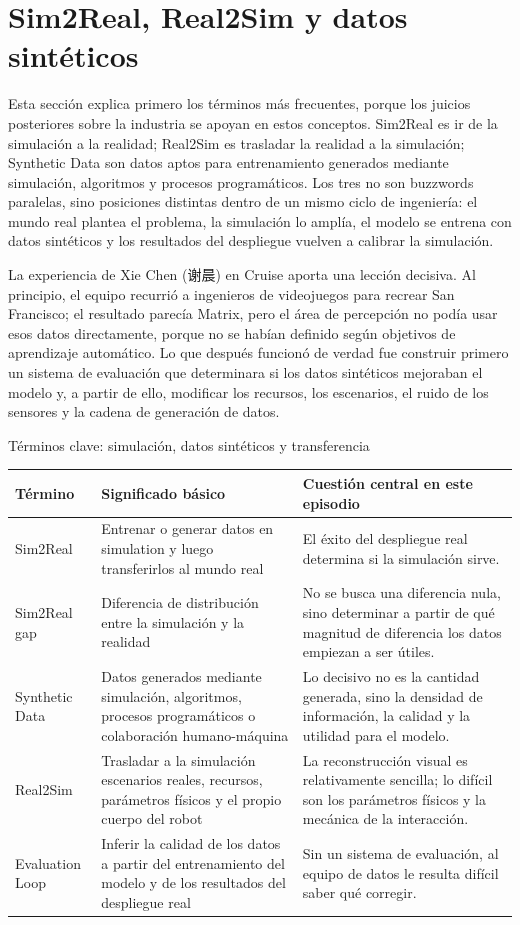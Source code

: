 \section{Sim2Real, Real2Sim y datos sintéticos}

Esta sección explica primero los términos más frecuentes, porque los juicios posteriores sobre la industria se apoyan en estos conceptos. Sim2Real es ir de la simulación a la realidad; Real2Sim es trasladar la realidad a la simulación; Synthetic Data son datos aptos para entrenamiento generados mediante simulación, algoritmos y procesos programáticos. Los tres no son buzzwords paralelas, sino posiciones distintas dentro de un mismo ciclo de ingeniería: el mundo real plantea el problema, la simulación lo amplía, el modelo se entrena con datos sintéticos y los resultados del despliegue vuelven a calibrar la simulación.

La experiencia de Xie Chen (谢晨) en Cruise aporta una lección decisiva. Al principio, el equipo recurrió a ingenieros de videojuegos para recrear San Francisco; el resultado parecía Matrix, pero el área de percepción no podía usar esos datos directamente, porque no se habían definido según objetivos de aprendizaje automático. Lo que después funcionó de verdad fue construir primero un sistema de evaluación que determinara si los datos sintéticos mejoraban el modelo y, a partir de ello, modificar los recursos, los escenarios, el ruido de los sensores y la cadena de generación de datos.

\begin{knowledgebox}{Términos clave: simulación, datos sintéticos y transferencia}
\begin{tabularx}{\textwidth}{p{}p{}X}
\toprule
Término & Significado básico & Cuestión central en este episodio \\
\midrule
Sim2Real & Entrenar o generar datos en simulation y luego transferirlos al mundo real & El éxito del despliegue real determina si la simulación sirve. \\
Sim2Real gap & Diferencia de distribución entre la simulación y la realidad & No se busca una diferencia nula, sino determinar a partir de qué magnitud de diferencia los datos empiezan a ser útiles. \\
Synthetic Data & Datos generados mediante simulación, algoritmos, procesos programáticos o colaboración humano-máquina & Lo decisivo no es la cantidad generada, sino la densidad de información, la calidad y la utilidad para el modelo. \\
Real2Sim & Trasladar a la simulación escenarios reales, recursos, parámetros físicos y el propio cuerpo del robot & La reconstrucción visual es relativamente sencilla; lo difícil son los parámetros físicos y la mecánica de la interacción. \\
Evaluation Loop & Inferir la calidad de los datos a partir del entrenamiento del modelo y de los resultados del despliegue real & Sin un sistema de evaluación, al equipo de datos le resulta difícil saber qué corregir. \\
\bottomrule
\end{tabularx}
\end{knowledgebox}

